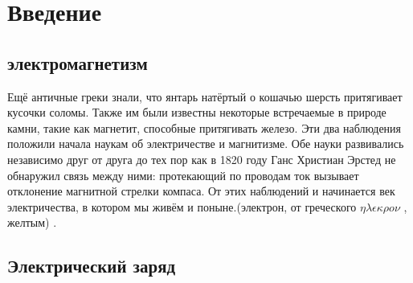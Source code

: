 \section{Введение}

\subsection{электромагнетизм}

Ещё античные греки знали, что янтарь натёртый о кошачью шерсть
притягивает кусочки соломы. Также им были известны некоторые встречаемые в природе камни, такие как магнетит,
способные притягивать железо. Эти два наблюдения положили начала наукам об электричестве и магнитизме. Обе науки
развивались независимо друг от друга до тех пор как в 1820 году Ганс Христиан Эрстед не обнаружил связь между ними: 
протекающий по проводам ток вызывает отклонение магнитной стрелки компаса. От этих наблюдений и начинается век 
электричества, в котором мы живём и поныне.(электрон, от греческого
$\eta\lambda\epsilon\kappa\rho o\nu$ ,
желтым) \cite{halliday}.

\subsection{Электрический заряд}


